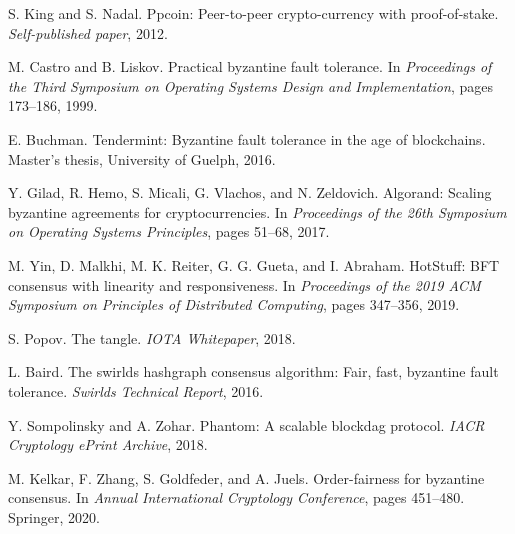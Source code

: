 \documentclass[11pt,a4paper]{article}
\begin{document}
\begin{thebibliography}{99}
S. King and S. Nadal.
\newblock Ppcoin: Peer-to-peer crypto-currency with proof-of-stake.
\newblock \emph{Self-published paper}, 2012.

M. Castro and B. Liskov.
\newblock Practical byzantine fault tolerance.
\newblock In \emph{Proceedings of the Third Symposium on Operating Systems Design and Implementation}, pages 173--186, 1999.

E. Buchman.
\newblock Tendermint: Byzantine fault tolerance in the age of blockchains.
\newblock Master's thesis, University of Guelph, 2016.

Y. Gilad, R. Hemo, S. Micali, G. Vlachos, and N. Zeldovich.
\newblock Algorand: Scaling byzantine agreements for cryptocurrencies.
\newblock In \emph{Proceedings of the 26th Symposium on Operating Systems Principles}, pages 51--68, 2017.

M. Yin, D. Malkhi, M. K. Reiter, G. G. Gueta, and I. Abraham.
\newblock HotStuff: BFT consensus with linearity and responsiveness.
\newblock In \emph{Proceedings of the 2019 ACM Symposium on Principles of Distributed Computing}, pages 347--356, 2019.

S. Popov.
\newblock The tangle.
\newblock \emph{IOTA Whitepaper}, 2018.

L. Baird.
\newblock The swirlds hashgraph consensus algorithm: Fair, fast, byzantine fault tolerance.
\newblock \emph{Swirlds Technical Report}, 2016.

Y. Sompolinsky and A. Zohar.
\newblock Phantom: A scalable blockdag protocol.
\newblock \emph{IACR Cryptology ePrint Archive}, 2018.

M. Kelkar, F. Zhang, S. Goldfeder, and A. Juels.
\newblock Order-fairness for byzantine consensus.
\newblock In \emph{Annual International Cryptology Conference}, pages 451--480. Springer, 2020.

\end{thebibliography}
\end{document}
